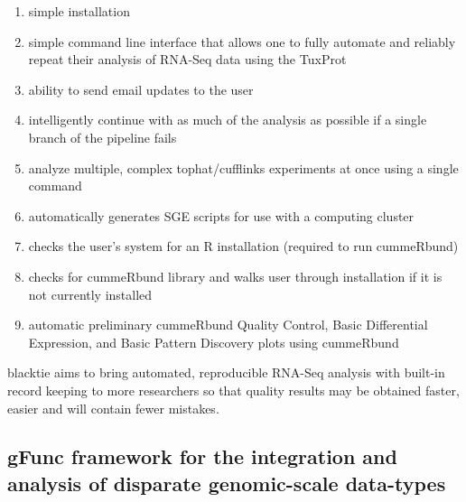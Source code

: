 \begin{enumerate}
    \item simple installation
    \item simple command line interface that allows one to fully automate and reliably repeat their analysis of \gls{RNA-Seq} data using the \gls{TuxProt}
    \item ability to send email updates to the user
    \item intelligently continue with as much of the analysis as possible if a single branch of the pipeline fails
    \item analyze multiple, complex \gls{tophat}/\gls{cufflinks} experiments at once using a single command
    \item automatically generates \gls{SGE} scripts for use with a computing cluster
    \item checks the user's system for an R installation (required to run \gls{cummeRbund})
    \item checks for \gls{cummeRbund} library and walks user through installation if it is not currently installed
    \item automatic preliminary  \gls{cummeRbund} Quality Control, Basic Differential Expression, and Basic Pattern Discovery plots using cummeRbund
\end{enumerate}



\gls{blacktie} aims to bring automated, reproducible \gls{RNA-Seq} analysis with built-in record keeping to more researchers so that quality results may be obtained faster, easier and will contain fewer mistakes.



\subsection{gFunc framework for the integration and analysis of disparate genomic-scale data-types}




